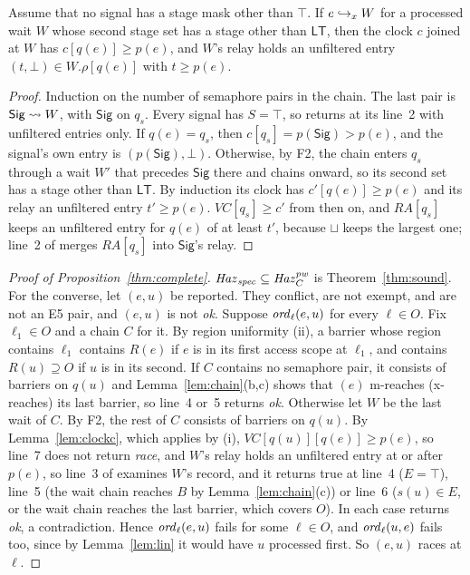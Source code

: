 \begin{lemma}\label{lem:clockc}
Assume that no signal has a stage mask other than $\top$. If $e \hookrightarrow_x W$ for a processed wait $W$ whose second
stage set has a stage other than $\mathsf{LT}$, then the clock $c$ joined at $W$ has $c[q(e)] \ge p(e)$, and $W$'s relay
holds an unfiltered entry $(t, \bot) \in W.\rho[q(e)]$ with $t \ge p(e)$.
\end{lemma}
\begin{proof}
Induction on the number of semaphore pairs in the chain. The last pair is $\mathsf{Sig} \rightsquigarrow W$, with $\mathsf{Sig}$
on $q_s$. Every signal has $S = \top$, so  returns at its line~2 with unfiltered entries only. If $q(e) =
q_s$, then $c[q_s] = p(\mathsf{Sig}) > p(e)$, and the signal's own entry is $(p(\mathsf{Sig}), \bot)$. Otherwise, by
F2, the chain enters $q_s$ through a wait $W'$ that precedes $\mathsf{Sig}$ there and chains onward, so its second set
has a stage other than $\mathsf{LT}$. By induction its clock has $c'[q(e)] \ge p(e)$ and its relay an unfiltered entry
$t' \ge p(e)$. $\mathit{VC}[q_s] \ge c'$ from then on, and $\mathit{RA}[q_s]$ keeps an unfiltered entry for $q(e)$ of at
least $t'$, because $\sqcup$ keeps the largest one; line~2 of  merges $\mathit{RA}[q_s]$ into $\mathsf{Sig}$'s
relay.
\end{proof}

\begin{proof}[Proof of Proposition~\ref{thm:complete}]
$\mathit{Haz}_{\mathit{spec}} \subseteq \mathit{Haz}_C^{\mathit{pw}}$ is Theorem~\ref{thm:sound}. For the converse, let $(e,u)$ be reported. They conflict, are not
exempt, and are not an E5 pair, and $(e,u)$ is not \emph{ok}. Suppose $\mathit{ord}_{\ell}(e,u)$
for every $\ell \in O$. Fix $\ell_1 \in O$ and a chain $C$ for it. By region uniformity (ii), a barrier whose region
contains $\ell_1$ contains $R(e)$ if $e$ is in its first access scope at $\ell_1$, and contains $R(u) \supseteq O$ if $u$
is in its second. If $C$ contains no semaphore pair, it consists of barriers on $q(u)$ and Lemma~\ref{lem:chain}(b,c)
shows that $(e)$ m-reaches (x-reaches) its last barrier, so line~4 or~5 returns \emph{ok}. Otherwise let $W$
be the last wait of $C$. By F2, the rest of $C$ consists of barriers on $q(u)$. By Lemma~\ref{lem:clockc}, which applies by (i), $\mathit{VC}[q(u)][q(e)] \ge p(e)$,
so line~7 does not return \emph{race}, and $W$'s relay holds an unfiltered entry at or after $p(e)$, so line~3 of
 examines $W$'s record, and it returns true at line~4 ($E = \top$), line~5 (the wait chain reaches $B$ by
Lemma~\ref{lem:chain}(c)) or line~6 ($s(u) \in E$, or the wait chain reaches the last barrier, which covers $O$).
In each case  returns \emph{ok}, a contradiction. Hence $\mathit{ord}_{\ell}(e,u)$ fails for some $\ell \in O$, and
$\mathit{ord}_{\ell}(u,e)$ fails too, since by Lemma~\ref{lem:lin} it would have $u$ processed first. So $(e,u)$ races at $\ell$.
\end{proof}

